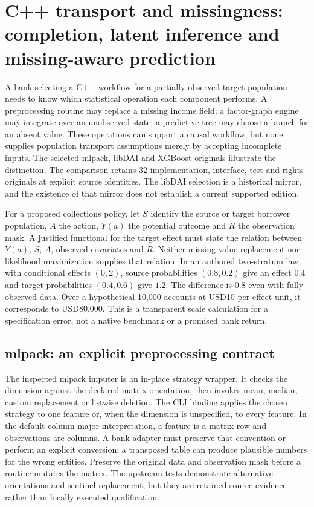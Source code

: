 \section[C++ transport and missingness contracts]{C++ transport and missingness: completion, latent inference and missing-aware prediction}
\label{sec:exec25-ctm}

A bank selecting a C++ workflow for a partially observed target population needs to know which statistical operation each component performs. A preprocessing routine may replace a missing income field; a factor-graph engine may integrate over an unobserved state; a predictive tree may choose a branch for an absent value. These operations can support a causal workflow, but none supplies population transport assumptions merely by accepting incomplete inputs. The selected mlpack, libDAI and XGBoost originals illustrate the distinction. The comparison retains 32 implementation, interface, test and rights originals at explicit source identities. The libDAI selection is a historical mirror, and the existence of that mirror does not establish a current supported edition.~\citep{exec25_ctm_mlpack,exec25_ctm_libdai,exec25_ctm_xgboost}

For a proposed collections policy, let $S$ identify the source or target borrower population, $A$ the action, $Y(a)$ the potential outcome and $R$ the observation mask. A justified functional for the target effect must state the relation between $Y(a)$, $S$, $A$, observed covariates and $R$. Neither missing-value replacement nor likelihood maximization supplies that relation. In an authored two-stratum law with conditional effects $(0,2)$, source probabilities $(0.8,0.2)$ give an effect $0.4$ and target probabilities $(0.4,0.6)$ give $1.2$. The difference is $0.8$ even with fully observed data. Over a hypothetical 10,000 accounts at USD10 per effect unit, it corresponds to USD80,000. This is a transparent scale calculation for a specification error, not a native benchmark or a promised bank return.~\citep{exec25_ctm_choice}

\subsection*{mlpack: an explicit preprocessing contract}
The inspected mlpack imputer is an in-place strategy wrapper. It checks the dimension against the declared matrix orientation, then invokes mean, median, custom replacement or listwise deletion. The CLI binding applies the chosen strategy to one feature or, when the dimension is unspecified, to every feature. In the default column-major interpretation, a feature is a matrix row and observations are columns. A bank adapter must preserve that convention or perform an explicit conversion; a transposed table can produce plausible numbers for the wrong entities. Preserve the original data and observation mask before a routine mutates the matrix. The upstream tests demonstrate alternative orientations and sentinel replacement, but they are retained source evidence rather than locally executed qualification.~\citep{exec25_ctm_mlpack}

